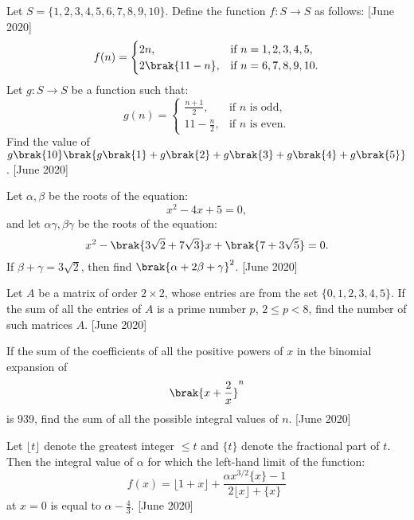 \iffalse
\title{June 2022-shift 2-16-30}
\author{ai24btech11028 - Ronit Ranjan}
\section{integer}
\fi 
    \item Let $ S = \{1, 2, 3, 4, 5, 6, 7, 8, 9, 10\} $. Define the function $ f: S \to S $ as follows:  \hfill{[June 2020]}
    \[
    f(n) = 
    \begin{cases}
    2n, & \text{if } n = 1, 2, 3, 4, 5, \\
    2\brak{11 - n}, & \text{if } n = 6, 7, 8, 9, 10.
    \end{cases}
    \]
    Let $ g: S \to S $ be a function such that:
    \[
    g(n) =
    \begin{cases}
    \frac{n+1}{2}, & \text{if } n \text{ is odd}, \\
    11 - \frac{n}{2}, & \text{if } n \text{ is even}.
    \end{cases}
    \]
    Find the value of $ g\brak{10} \brak{ g\brak{1} + g\brak{2} + g\brak{3} + g\brak{4} + g\brak{5} } $.  \hfill{[June 2020]}

    \item Let $ \alpha, \beta $ be the roots of the equation: 
    \[
    x^2 - 4x + 5 = 0,
    \]
    and let $ \alpha \gamma, \beta \gamma $ be the roots of the equation:
    \[
    x^2 - \brak{3\sqrt{2} + 7\sqrt{3}}x + \brak{7 + 3\sqrt{5}} = 0.
    \]
    If $ \beta + \gamma = 3\sqrt{2} $, then find $ \brak{\alpha + 2\beta + \gamma}^2 $. \hfill{[June 2020]}

    \item Let $ A $ be a matrix of order $ 2 \times 2 $, whose entries are from the set $ \{0, 1, 2, 3, 4, 5\} $. If the sum of all the entries of $ A $ is a prime number $ p $, $ 2 \leq p < 8 $, find the number of such matrices $ A $. \hfill{[June 2020]}

    \item If the sum of the coefficients of all the positive powers of $ x $ in the binomial expansion of 
    \[
    \brak{x + \frac{2}{x}}^n
    \]
    is 939, find the sum of all the possible integral values of $ n $. \hfill{[June 2020]}


    \item Let $ \lfloor t \rfloor $ denote the greatest integer $ \leq t $ and $ \{ t \} $ denote the fractional part of $ t $. Then the integral value of $ \alpha $ for which the left-hand limit of the function:
    \[
    f(x) = \lfloor 1 + x \rfloor + \frac{\alpha x^{3/2} \{ x \} - 1}{2 \lfloor x \rfloor + \{ x \}}
    \]
    at $ x = 0 $ is equal to $ \alpha - \frac{4}{3} $.  \hfill{[June 2020]}

